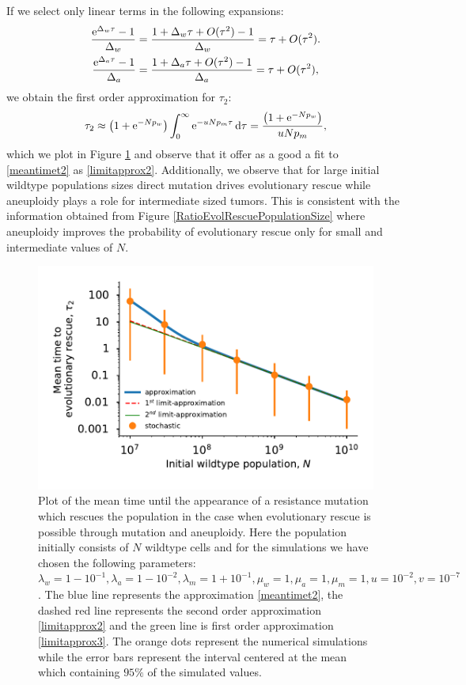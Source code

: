 \documentclass[12pt]{extarticle}
\renewcommand{\d}{{\rm d}}
\newcommand{\e}{{\rm e}}
\begin{document}
If we select only linear terms in the following expansions:
\begin{align*}
\frac{\e^{\Delta_w\tau}-1}{\Delta_w}&=\frac{1+\Delta_w\tau+O(\tau^2)-1}{\Delta_w}=\tau+O(\tau^2).\\
\frac{\e^{\Delta_a\tau}-1}{\Delta_a}&=\frac{1+\Delta_a\tau+O(\tau^2)-1}{\Delta_a}=\tau+O(\tau^2),
\end{align*}
we obtain the first order approximation for $\tau_2$:
\begin{align}\label{limitapprox3}
\tau_2\approx\left(1+\e^{-Np_w}\right)\int_0^\infty\e^{-uNp_m\tau}\,\d\tau=\frac{\left(1+\e^{-Np_w}\right)}{uNp_m},
\end{align}
which we plot in Figure \ref{MeanTimeDeleteriousAneuploidyPlot} and observe that it offer as a good a fit to \eqref{meantimet2} as \eqref{limitapprox2}. Additionally, we observe that for large initial wildtype populations sizes direct mutation drives evolutionary rescue while aneuploidy plays a role for intermediate sized tumors. This is consistent with the information obtained from Figure \ref{RatioEvolRescuePopulationSize} where aneuploidy improves the probability of evolutionary rescue only  for small and intermediate values of $N$.
\begin{figure}[!h]
 \vspace*{1\baselineskip}
\includegraphics[width=1\textwidth]{Figures/MeanTimeDeleteriousPlot.pdf}
\caption{Plot of the mean time until the appearance of a resistance mutation which rescues the population in the case when evolutionary rescue is possible 
 through mutation and aneuploidy.  Here the population initially consists of $N$ wildtype cells and for the simulations we have chosen the following parameters: $\lambda_w=1-10^{-1},\lambda_a=1-10^{-2},\lambda_m=1+10^{-1},\mu_w=1,\mu_a=1,\mu_m=1,u=10^{-2},v=10^{-7}$.  The blue line represents the approximation \eqref{meantimet2}, the dashed red line represents the second order approximation \eqref{limitapprox2} and the green line is first order approximation \eqref{limitapprox3}. The orange dots represent the numerical simulations while the error bars represent the interval centered at the mean which containing $95\%$ of the simulated values.}
\label{MeanTimeDeleteriousAneuploidyPlot}
\end{figure}
\end{document}
